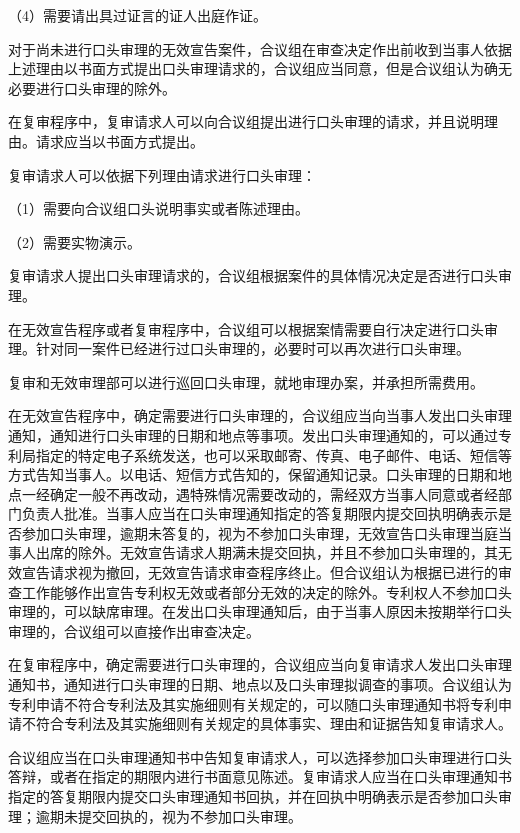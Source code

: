 {\setlength{\parindent}{17.1bp}（4）需要请出具过证言的证人出庭作证。\par}

对于尚未进行口头审理的无效宣告案件，合议组在审查决定作出前收到当事人依据上述理由以书面方式提出口头审理请求的，合议组应当同意，但是合议组认为确无必要进行口头审理的除外。

在复审程序中，复审请求人可以向合议组提出进行口头审理的请求，并且说明理由。请求应当以书面方式提出。

复审请求人可以依据下列理由请求进行口头审理：

{\setlength{\parindent}{17.1bp}（1）需要向合议组口头说明事实或者陈述理由。\par}

{\setlength{\parindent}{17.1bp}（2）需要实物演示。\par}

复审请求人提出口头审理请求的，合议组根据案件的具体情况决定是否进行口头审理。

在无效宣告程序或者复审程序中，合议组可以根据案情需要自行决定进行口头审理。针对同一案件已经进行过口头审理的，必要时可以再次进行口头审理。

复审和无效审理部可以进行巡回口头审理，就地审理办案，并承担所需费用。

在无效宣告程序中，确定需要进行口头审理的，合议组应当向当事人发出口头审理通知，通知进行口头审理的日期和地点等事项。发出口头审理通知的，可以通过专利局指定的特定电子系统发送，也可以采取邮寄、传真、电子邮件、电话、短信等方式告知当事人。以电话、短信方式告知的，保留通知记录。口头审理的日期和地点一经确定一般不再改动，遇特殊情况需要改动的，需经双方当事人同意或者经部门负责人批准。当事人应当在口头审理通知指定的答复期限内提交回执明确表示是否参加口头审理，逾期未答复的，视为不参加口头审理，无效宣告口头审理当庭当事人出席的除外。无效宣告请求人期满未提交回执，并且不参加口头审理的，其无效宣告请求视为撤回，无效宣告请求审查程序终止。但合议组认为根据已进行的审查工作能够作出宣告专利权无效或者部分无效的决定的除外。专利权人不参加口头审理的，可以缺席审理。在发出口头审理通知后，由于当事人原因未按期举行口头审理的，合议组可以直接作出审查决定。

在复审程序中，确定需要进行口头审理的，合议组应当向复审请求人发出口头审理通知书，通知进行口头审理的日期、地点以及口头审理拟调查的事项。合议组认为专利申请不符合专利法及其实施细则有关规定的，可以随口头审理通知书将专利申请不符合专利法及其实施细则有关规定的具体事实、理由和证据告知复审请求人。

合议组应当在口头审理通知书中告知复审请求人，可以选择参加口头审理进行口头答辩，或者在指定的期限内进行书面意见陈述。复审请求人应当在口头审理通知书指定的答复期限内提交口头审理通知书回执，并在回执中明确表示是否参加口头审理；逾期未提交回执的，视为不参加口头审理。

